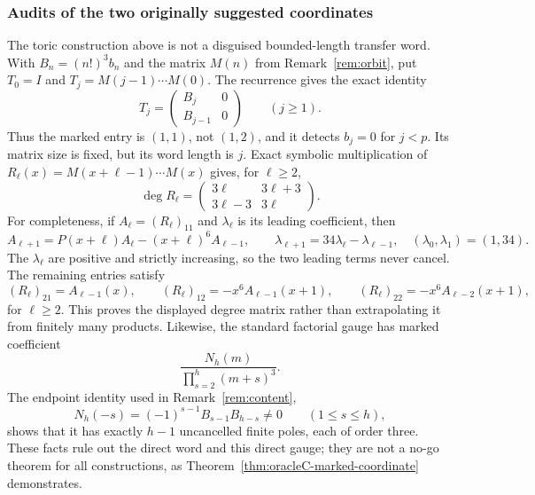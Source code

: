 \subsubsection{Audits of the two originally suggested coordinates}

The toric construction above is not a disguised bounded-length transfer
word.  With $B_n=(n!)^3b_n$ and the matrix $M(n)$ from
Remark~\ref{rem:orbit}, put $T_0=I$ and
$T_j=M(j-1)\cdots M(0)$.  The recurrence gives the exact identity
\begin{equation}
 T_j=\begin{pmatrix}B_j&0\\B_{j-1}&0\end{pmatrix}
 \qquad(j\geq1).
 \label{eq:oracleC-transfer-marker}
\end{equation}
Thus the marked entry is $(1,1)$, not $(1,2)$, and it detects $b_j=0$
for $j<p$.  Its matrix size is fixed, but its word length is $j$.  Exact
symbolic multiplication of
$R_\ell(x)=M(x+\ell-1)\cdots M(x)$ gives, for $\ell\geq2$,
\[
 \deg R_\ell=
 \begin{pmatrix}3\ell&3\ell+3\\3\ell-3&3\ell\end{pmatrix}.
\]
For completeness, if $A_\ell=(R_\ell)_{11}$ and $\lambda_\ell$ is its
leading coefficient, then
\[
 A_{\ell+1}=P(x+\ell)A_\ell-(x+\ell)^6A_{\ell-1},
 \qquad
 \lambda_{\ell+1}=34\lambda_\ell-\lambda_{\ell-1},
 \quad(\lambda_0,\lambda_1)=(1,34).
\]
The $\lambda_\ell$ are positive and strictly increasing, so the two
leading terms never cancel.  The remaining entries satisfy
\[
 (R_\ell)_{21}=A_{\ell-1}(x),\qquad
 (R_\ell)_{12}=-x^6A_{\ell-1}(x+1),\qquad
 (R_\ell)_{22}=-x^6A_{\ell-2}(x+1),
\]
for $\ell\geq2$.  This proves the displayed degree matrix rather than
extrapolating it from finitely many products.
Likewise, the standard factorial gauge has marked coefficient
\[
 \frac{N_h(m)}{\prod_{s=2}^h(m+s)^3}.
\]
The endpoint identity used in Remark~\ref{rem:content},
\[
 N_h(-s)=(-1)^{s-1}B_{s-1}B_{h-s}\ne0
 \qquad(1\leq s\leq h),
\]
shows that it has exactly $h-1$ uncancelled finite poles, each of order
three.  These facts rule out the direct word and this direct gauge; they
are not a no-go theorem for all constructions, as
Theorem~\ref{thm:oracleC-marked-coordinate} demonstrates.

